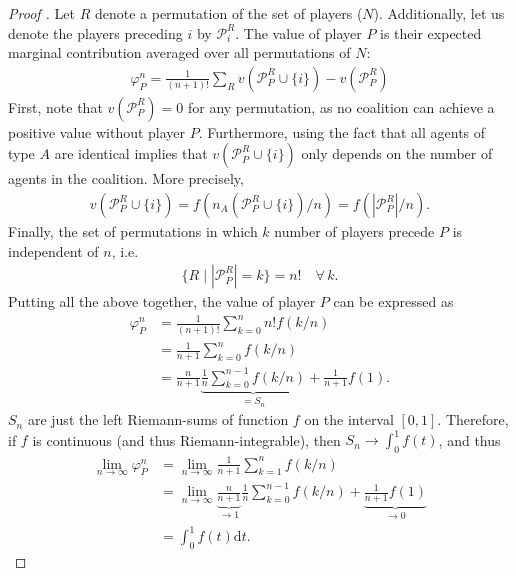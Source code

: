 \documentclass[a4paper]{article}
\newcommand{\dt}{\mathrm{d}t}
\begin{document}
\begin{proof}[Proof%
    ]
    Let $R$ denote a permutation of the set of players ($N$). Additionally, let us denote the players preceding $i$ by $\mathcal{P}_i^R$. The value of player $P$ is their expected marginal contribution averaged over all permutations of $N$:
    \begin{align*}
        \varphi_P^n = \frac{1}{(n+1)!} \sum_R v(\mathcal{P}_P^R \cup \{i\}) - v(\mathcal{P}_P^R)
    \end{align*}
    First, note that $v(\mathcal{P}_P^R) = 0$ for any permutation, as no coalition can achieve a positive value without player $P$. Furthermore, using the fact that all agents of type $A$ are identical implies that $v(\mathcal{P}_P^R \cup \{i\})$ only depends on the number of agents in the coalition. More precisely, 
    \begin{align*}
        v(\mathcal{P}_P^R \cup \{i\}) = f(n_A(\mathcal{P}_P^R \cup \{i\}) / n) = f(|\mathcal{P}_P^R| / n).
    \end{align*}
    Finally, the set of permutations in which $k$ number of players precede $P$ is independent of $n$, i.e.
    \begin{align*}
        \{R \mid |\mathcal{P}_P^R| = k\} = n! \quad \forall\, k.
    \end{align*}
    Putting all the above together, the value of player $P$ can be expressed as
    \begin{align*}
        \varphi_P^n &= \frac{1}{(n+1)!} \sum_{k=0}^n n! f(k / n) \\
        &= \frac{1}{n+1} \sum_{k=0}^n f(k / n) \\
        &= \frac{n}{n+1} \underbrace{\frac{1}{n} \sum_{k=0}^{n-1} f(k / n)}_{=S_n} + \frac{1}{n+1} f(1).
    \end{align*}
    $S_n$ are just the left Riemann-sums of function $f$ on the interval $[0, 1]$. Therefore, if $f$ is continuous (and thus Riemann-integrable), then $S_n \to \int_0^1 f(t)$, and thus
    \begin{align*}
        \lim_{n \to \infty} \varphi_P^n &= \lim_{n \to \infty} \frac{1}{n+1} \sum_{k=1}^n f(k / n) \\
        &= \lim_{n \to \infty}\underbrace{\frac{n}{n+1}}_{\to 1} \frac{1}{n} \sum_{k=0}^{n-1} f(k / n) + \underbrace{\frac{1}{n+1} f(1)}_{\to 0} \\
        &= \int_0^1 f(t) \dt .
    \end{align*}
\end{proof}
\end{document}
